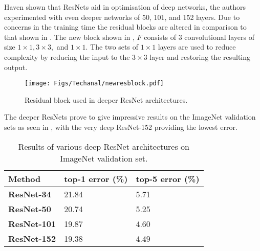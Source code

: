 Haven shown that ResNets aid in optimisation of deep networks, the authors experimented with even deeper networks of 50, 101, and 152 layers. Due to concerns in the training time the residual blocks are altered in comparison to that shown in . The new block shown in , $F$ consists of 3 convolutional layers of size $1 \times 1, 3 \times 3,$ and $1 \times 1$. The two sets of $1 \times 1$ layers are used to reduce complexity by reducing the input to the $3 \times 3$ layer and restoring the resulting output. 

\begin{figure}[H]
  \centering
    \texttt{[image: Figs/Techanal/newresblock.pdf]}
    \caption{Residual block used in deeper ResNet architectures.}
    \label{fig:newresblock}
\end{figure}


The deeper ResNets prove to give impressive results on the ImageNet validation sets as seen in , with the very deep ResNet-152 providing the lowest error.

\begin{table}[]
\centering
\caption{Results of various deep ResNet architectures on ImageNet validation set.}
\label{tab:deepresimagenet}
\begin{tabular}{|l|l|l|}
\hline
\textbf{Method}     & \textbf{top-1 error (\%)} & \textbf{top-5 error (\%)} \\ \hline
\textbf{ResNet-34}  & 21.84            & 5.71             \\ \hline
\textbf{ResNet-50}  & 20.74            & 5.25             \\ \hline
\textbf{ResNet-101} & 19.87            & 4.60             \\ \hline
\textbf{ResNet-152} & 19.38            & 4.49             \\ \hline
\end{tabular}
\end{table}

